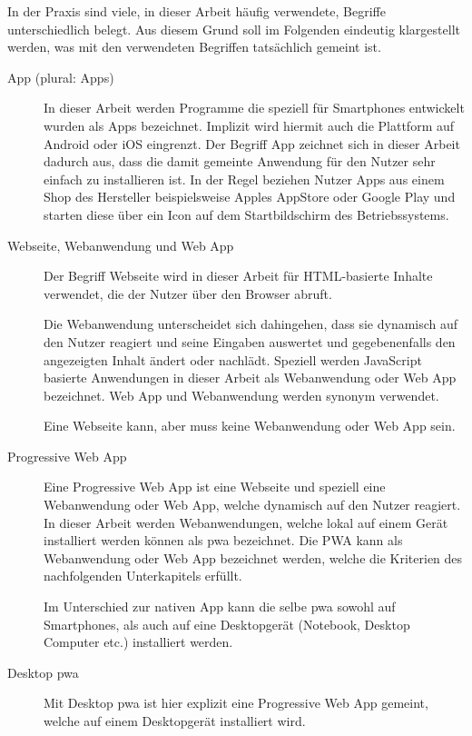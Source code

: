 In der Praxis sind viele, in dieser Arbeit häufig verwendete, Begriffe unterschiedlich belegt. Aus diesem Grund soll im Folgenden eindeutig klargestellt werden, was mit den verwendeten Begriffen tatsächlich gemeint ist.

\begin{description}
	\item [App (plural: Apps)]
		In dieser Arbeit werden Programme die speziell für Smartphones entwickelt wurden als Apps bezeichnet. Implizit wird hiermit auch die Plattform auf Android oder iOS eingrenzt. Der Begriff App zeichnet sich in dieser Arbeit dadurch aus, dass die damit gemeinte Anwendung für den Nutzer sehr einfach zu installieren ist. In der Regel beziehen Nutzer Apps aus einem Shop des Hersteller beispielsweise Apples AppStore oder Google Play und starten diese über ein Icon auf dem Startbildschirm des Betriebssystems.
		
	\item [Webseite, Webanwendung und Web App]
		Der Begriff Webseite wird in dieser Arbeit für HTML-basierte Inhalte verwendet, die der Nutzer über den Browser abruft.
		
		Die Webanwendung unterscheidet sich dahingehen, dass sie dynamisch auf den Nutzer reagiert und seine Eingaben auswertet und gegebenenfalls den angezeigten Inhalt ändert oder nachlädt. Speziell werden JavaScript basierte Anwendungen in dieser Arbeit als Webanwendung oder Web App bezeichnet. Web App und Webanwendung werden synonym verwendet.
		
		Eine Webseite kann, aber muss keine Webanwendung oder Web App sein.
	
	\item [Progressive Web App]
		Eine Progressive Web App ist eine Webseite und speziell eine Webanwendung oder Web App, welche dynamisch auf den Nutzer reagiert.
		In dieser Arbeit werden Webanwendungen, welche lokal auf einem Gerät installiert werden können als \acf{pwa} bezeichnet. Die PWA kann als Webanwendung oder Web App bezeichnet werden, welche die Kriterien des nachfolgenden Unterkapitels erfüllt.
		
		Im Unterschied zur nativen App kann die selbe \ac{pwa} sowohl auf Smartphones, als auch auf eine Desktopgerät (Notebook, Desktop Computer etc.) installiert werden.
		
	\item [Desktop \ac{pwa}]
		Mit Desktop \ac{pwa} ist hier explizit eine Progressive Web App gemeint, welche auf einem Desktopgerät installiert wird.
			

\end{description}
